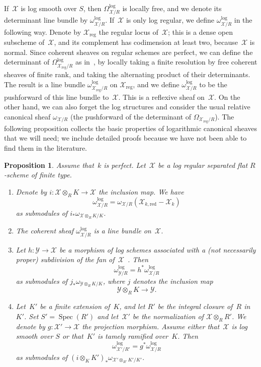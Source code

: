 \documentclass[11pt]{article}
\newtheorem{prop}[equation]{Proposition}
\theoremstyle{definition}
\numberwithin{equation}{subsection}
\newcommand{\cX}{\ensuremath{\mathscr{X}}}
\newcommand{\cY}{\ensuremath{\mathscr{Y}}}
\newcommand{\red}{\mathrm{red}}
\newcommand{\reg}{\mathrm{reg}}
\DeclareMathOperator{\Spec}{Spec}
\begin{document}
If~$\cX$ is log smooth over $S$, then $\Omega^{\log}_{\cX/R}$ is locally free, and we denote its determinant line bundle by
$\omega_{\cX/R}^{\log}$.
If~$\cX$ is only log regular, we define $\omega_{\cX/R}^{\log}$ in the following way. Denote by $\cX_{\reg}$ the regular locus of~$\cX$; this is a dense open subscheme of~$\cX$, and its complement has codimension at least two, because~$\cX$ is normal. Since coherent sheaves on regular schemes are perfect, we can define the determinant of $\Omega^{\log}_{\cX_{\reg}/R}$ as in~\cite{knudsen-mumford}, by locally taking a finite resolution by free coherent sheaves of finite rank, and taking the alternating product of their determinants. The result is a line bundle $\omega_{\cX_{\reg}/R}^{\log}$ on $\cX_{\reg}$, and we define $\omega^{\log}_{\cX/R}$ to be the pushforward of this line bundle to~$\cX$. This is a reflexive sheaf on~$\cX$. On the other hand, we can also forget the log structures and consider the usual relative canonical sheaf $\omega_{\cX/R}$ (the pushforward of the determinant of
$\Omega_{\cX_{\reg}/R}$). The following proposition collects the basic properties of logarithmic canonical sheaves that we will need; we include detailed proofs because we have not been able to find them in the literature.

\begin{prop}\label{prop:can}
Assume that~$k$ is perfect.
Let~$\cX$ be a log regular separated flat $R$\nobreakdash-scheme of finite type.
\begin{enumerate}
\item \label{it:logcan} Denote by $i\colon \cX\otimes_R K\to \cX$ the inclusion map. We have
\[
\omega^{\log}_{\cX/R}=\omega_{\cX/R}(\cX_{k,\red}-\cX_k)
\]
as submodules of $i_\ast \omega_{\cX\otimes_R K/K}$.
\item \label{it:lineb} The coherent sheaf $\omega^{\log}_{\cX/R}$ is a line bundle on~$\cX$.
\item \label{it:loget}
Let $h\colon \cY\to \cX$ be a morphism of log schemes associated with a (not necessarily proper) subdivision of the fan of~$\cX$~\cite[9.9]{kato}. Then
\[
\omega^{\log}_{\cY/R}=h^{\ast}\omega^{\log}_{\cX/R}
\]
as submodules of $j_\ast \omega_{\cY\otimes_R K/K}$, where $j$ denotes the inclusion map
\[
\cY\otimes_R K\to \cY.
\]
\item \label{it:canbc} Let~$K'$ be a finite extension of~$K$, and let $R'$ be the integral closure of~$R$ in~$K'$.
Set $S'=\Spec(R')$ and let~$\cX'$ be the normalization of $\cX\otimes_R R'$. We denote by $g\colon \cX'\to \cX$ the projection morphism.
Assume either that~$\cX$ is log smooth over $S$ or that~$K'$ is tamely ramified over~$K$.
Then
\[
\omega^{\log}_{\cX'/R'}=g^{\ast}\omega^{\log}_{\cX/R}
\]
as submodules of $(i\otimes_K K')_\ast \omega_{\cX'\otimes_{R'} K'/K'}$.
\end{enumerate}
\end{prop}
\end{document}
